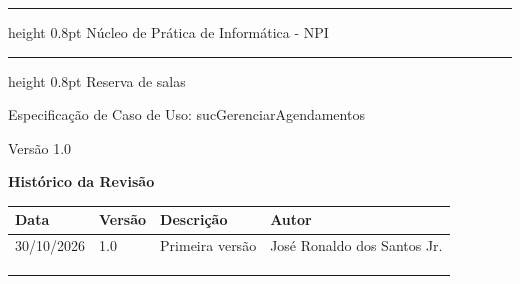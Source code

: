 \documentclass[12pt,a4paper]{article}
\newcommand{\ucnome}{sucGerenciarAgendamentos}
\newcommand{\ucprojeto}{Reserva de salas}
\newcommand{\ucversao}{1.0}
\newcommand{\ucdata}{30/10/2026}
\newcommand{\ucautor}{José Ronaldo dos Santos Jr.}
\newcommand{\ucorgao}{Núcleo de Prática de Informática - NPI}
\newcommand{\uctitulo}{Especificação de Caso de Uso: \ucnome}
\begin{document}

\thispagestyle{empty}
\vspace*{-3.3cm}
{\bfseries
  \hrule height 0.8pt
  \vspace{10pt}
  \raggedleft \Large \ucorgao \par
  \vspace{10pt}
  \hrule height 0.8pt
  \vspace{36pt}
  \raggedleft \Large \ucprojeto \par
  \vspace{12pt}
  \raggedleft \Large \uctitulo \par
  \vspace{36pt}
  \raggedleft \large Versão \ucversao \par
}
\newpage


\begin{center}
  {\Large\bfseries Histórico da Revisão}
\end{center}

\vspace{\baselineskip}

{\small
\noindent
\begin{tabularx}{\textwidth}{|p{2.6cm}|p{1.6cm}|X|p{3.6cm}|}
  \hline
  \centering\textbf{Data} & \centering\textbf{Versão} & \centering\textbf{Descrição}
    & \centering\arraybackslash\textbf{Autor} \\
  \hline
  \ucdata & \ucversao & Primeira versão & \ucautor \\
  \hline
  & & & \\
  \hline
  & & & \\
  \hline
  & & & \\
  \hline
\end{tabularx}
\par}

\vspace{\baselineskip}

{\tableofcontents\par}
\thispagestyle{fancy}
\newpage
\end{document}
